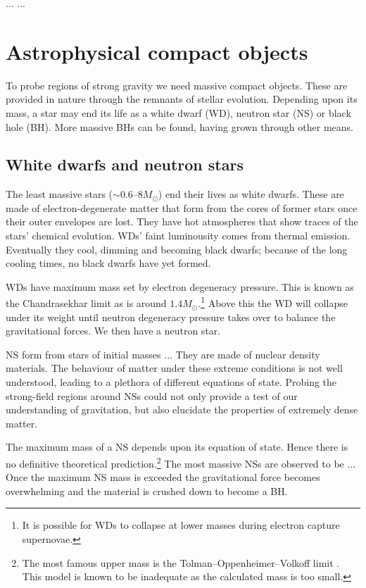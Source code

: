 ...
...

\section{Astrophysical compact objects}

To probe regions of strong gravity we need massive compact objects. These are provided in nature through the remnants of stellar evolution. Depending upon its mass, a star may end its life as a white dwarf (WD), neutron star (NS) or black hole (BH). More massive BHs can be found, having grown through other means.

\subsection{White dwarfs and neutron stars}

The least massive stars ($\sim0.6$--$8M_\odot$) end their lives as white dwarfs. These are made of electron-degenerate matter that form from the cores of former stars once their outer envelopes are lost. They have hot atmospheres that show traces of the stars' chemical evolution. WDs' faint luminousity comes from thermal emission. Eventually they cool, dimming and becoming black dwarfs; because of the long cooling times, no black dwarfs have yet formed.

WDs have maximum mass set by electron degeneracy pressure. This is known as the Chandrasekhar limit as is around $1.4 M_\odot$.\footnote{It is possible for WDs to collapse at lower masses during electron capture supernovae.} Above this the WD will collapse under its weight until neutron degeneracy pressure takes over to balance the gravitational forces. We then have a neutron star.

NS form from stars of initial masses ... They are made of nuclear density materials. The behaviour of matter under these extreme conditions is not well understood, leading to a plethora of different equations of state. Probing the strong-field regions around NSs could not only provide a test of our understanding of gravitation, but also elucidate the properties of extremely dense matter.

The maximum mass of a NS depends upon its equation of state. Hence there is no definitive theoretical prediction.\footnote{The most famous upper mass is the Tolman--Oppenheimer--Volkoff limit \citep{Tolman1939,Oppenheimer1939}. This model is known to be inadequate as the calculated mass is too small.} The most massive NSs are observed to be ... Once the maximum NS mass is exceeded the gravitational force becomes overwhelming and the material is crushed down to become a BH.

